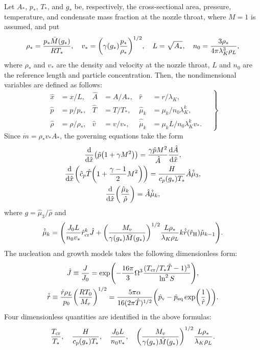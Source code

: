 \documentclass{article}
\newcommand{\vap}{\text{v}}
\newcommand{\eq}{\text{eq}}
\newcommand{\crit}[2][]{#2_\text{cr#1}}
\newcommand{\Hill}{\text{H}}
\begin{document}
Let $A_*$, $p_*$, $T_*$, and $g_*$ be, respectively, the cross-sectional area, pressure, temperature,
and condensate mass fraction at the nozzle throat, where $M=1$ is assumed, and put
\begin{equation}\label{eq:reference}
    \rho_* = \frac{p_*\bar{M}(g_*)}{RT_*}, \quad
    v_* = \qty(\gamma(g_*)\frac{p_*}{\rho_*})^{1/2}, \quad
    L = \sqrt{A_*}, \quad
    n_0 = \frac{3\rho_*}{4\pi\lambda_K^3\rho_L},
\end{equation}
where $\rho_*$ and $v_*$ are the density and velocity at the nozzle throat,
$L$ and $n_0$ are the reference length and particle concentration.
Then, the nondimensional variables are defined as follows:
\begin{equation}\label{eq:nondimensional}
    \left.\begin{aligned}
        \hat{x} &= x/L,             &\hat{A} &= A/A_*,  &\hat{r} &= r/\lambda_K, \\
        \hat{p} &= p/p_*,           &\hat{T} &= T/T_*,  &\hat{\mu}_k &= \mu_k/n_0\lambda_K^k, \\
        \hat{\rho} &= \rho/\rho_*,  &\hat{v} &= v/v_*,  &\hat{\dot{\mu}}_k &= \mu_kL/n_0\lambda_K^kv_*.
    \end{aligned}\quad\right\}
\end{equation}
Since $\dot{m} = \rho_*v_*A_*$, the governing equations take the form
\begin{gather}
    \dv{\hat{x}}(\hat{p}\qty(1 + \gamma M^2))
        = \frac{\gamma \hat{p} M^2}{\hat{A}}\dv{\hat{A}}{\hat{x}}, \label{eq:momentum3}\\
    \dv{\hat{x}}(\hat{c}_p\hat{T}\qty(1 + \frac{\gamma-1}{2}M^2))
        = \frac{H}{c_p(g_*)T_*}\hat{A}\hat{\dot{\mu}}_3, \label{eq:energy3}\\
    \dv{\hat{x}}(\frac{\hat{\mu}_k}{\hat{\rho}}) = \hat{A}\hat{\dot{\mu}}_k, \label{eq:moments3}
\end{gather}
where $g = \hat{\mu}_3/\hat{\rho}$ and
\begin{equation}\label{eq:dot_mu_k}
    \hat{\dot{\mu}}_k = \qty( \frac{J_0L}{n_0v_*} \crit{\hat{r}}^{k}\hat{J}
        + \qty(\frac{M_v}{\gamma(g_*)\bar{M}(g_*)})^{1/2}\frac{L\rho_*}{\lambda_K\rho_L}
            k\hat{\dot{r}}(\hat{r}_\Hill)\hat{\mu}_{k-1}).
\end{equation}
The nucleation and growth models takes the following dimensionless form:
\begin{gather}
    \hat{J} \equiv \frac{J}{J_0}
        = \exp(-\frac{16\pi}{3}\Omega^3\frac{(\crit{T}/T_*\hat{T}-1)^3}{\ln^2{S}}), \label{eq:nucleation3}\\
    \hat{\dot{r}} \equiv \frac{\dot{r}\rho_L}{p_0}\qty(\frac{RT_0}{M_v})^{1/2}
        = \frac{5\pi\alpha}{16(2\pi\hat{T})^{1/2}}
            \qty(\hat{p}_\vap - \hat{p}_\eq\exp(\frac1{\hat{r}})). \label{eq:growth3}
\end{gather}
Four dimensionless quantities are identified in the above formulas:
\begin{equation}\label{eq:dimensionless}
    \frac{\crit{T}}{T_*}, \quad \frac{H}{c_p(g_*)T_*}, \quad
    \frac{J_0L}{n_0v_*}, \quad \qty(\frac{M_v}{\gamma(g_*)\bar{M}(g_*)})^{1/2}\frac{L\rho_*}{\lambda_K\rho_L}.
\end{equation}
\end{document}
